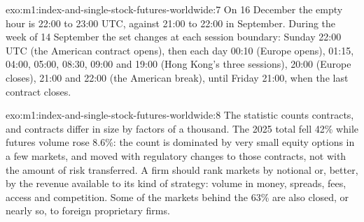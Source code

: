 \begin{solution}{exo:m1:index-and-single-stock-futures-worldwide:7}
On 16 December the empty hour is 22:00 to 23:00 UTC, against 21:00 to 22:00
in September. During the week of 14 September the set changes at each
session boundary: Sunday 22:00 UTC (the American contract opens), then each
day 00:10 (Europe opens), 01:15, 04:00, 05:00, 08:30, 09:00 and 19:00 (Hong
Kong's three sessions), 20:00 (Europe closes), 21:00 and 22:00 (the American
break), until Friday 21:00, when the last contract closes.
\end{solution}

\begin{solution}{exo:m1:index-and-single-stock-futures-worldwide:8}
The statistic counts contracts, and contracts differ in size by factors of a
thousand. The 2025 total fell 42\% while futures volume rose 8.6\%: the count
is dominated by very small equity options in a few markets, and moved with
regulatory changes to those contracts, not with the amount of risk
transferred. A firm should rank markets by notional or, better, by the
revenue available to its kind of strategy: volume in money, spreads, fees,
access and competition. Some of the markets behind the 63\% are also closed,
or nearly so, to foreign proprietary firms.
\end{solution}

